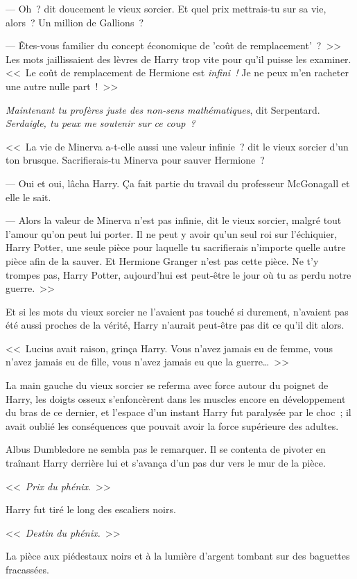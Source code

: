 --- Oh~? dit doucement le vieux sorcier. Et quel prix mettrais-tu sur sa vie, alors~? Un million de Gallions~?

--- Êtes-vous familier du concept économique de 'coût de remplacement'~?~>> Les mots jaillissaient des lèvres de Harry trop vite pour qu'il puisse les examiner. <<~Le coût de remplacement de Hermione est \emph{infini~!} Je ne peux m'en racheter une autre nulle part~!~>>

\emph{Maintenant tu profères juste des non-sens mathématiques}, dit Serpentard. \emph{Serdaigle, tu peux me soutenir sur ce coup~?}

<<~La vie de Minerva a-t-elle aussi une valeur infinie~? dit le vieux sorcier d'un ton brusque. Sacrifierais-tu Minerva pour sauver Hermione~?

--- Oui et oui, lâcha Harry. Ça fait partie du travail du professeur McGonagall et elle le sait.

--- Alors la valeur de Minerva n'est pas infinie, dit le vieux sorcier, malgré tout l'amour qu'on peut lui porter. Il ne peut y avoir qu'un seul roi sur l'échiquier, Harry Potter, une seule pièce pour laquelle tu sacrifierais n'importe quelle autre pièce afin de la sauver. Et Hermione Granger n'est pas cette pièce. Ne t'y trompes pas, Harry Potter, aujourd'hui est peut-être le jour où tu as perdu notre guerre.~>>

Et si les mots du vieux sorcier ne l'avaient pas touché si durement, n'avaient pas été aussi proches de la vérité, Harry n'aurait peut-être pas dit ce qu'il dit alors.

<<~Lucius avait raison, grinça Harry. Vous n'avez jamais eu de femme, vous n'avez jamais eu de fille, vous n'avez jamais eu que la guerre…~>>

La main gauche du vieux sorcier se referma avec force autour du poignet de Harry, les doigts osseux s'enfoncèrent dans les muscles encore en développement du bras de ce dernier, et l'espace d'un instant Harry fut paralysée par le choc~; il avait oublié les conséquences que pouvait avoir la force supérieure des adultes.

Albus Dumbledore ne sembla pas le remarquer. Il se contenta de pivoter en traînant Harry derrière lui et s'avança d'un pas dur vers le mur de la pièce.

<<~\emph{Prix du phénix}.~>>

Harry fut tiré le long des escaliers noirs.

<<~\emph{Destin du phénix.}~>>

La pièce aux piédestaux noirs et à la lumière d'argent tombant sur des baguettes fracassées.

